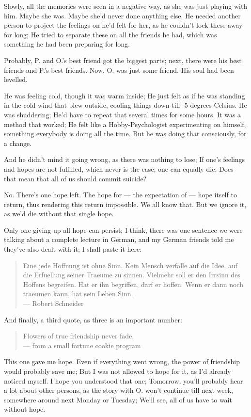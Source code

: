 Slowly, all the memories were seen in a negative way, as she was just playing with him. 
Maybe she was. 
Maybe she'd never done anything else. 
He needed another person to project the feelings on he'd felt for her, as he couldn't lock these away for long; He tried to separate these on all the friends he had, which was something he had been preparing for long.

Probably, P. and O.'s best friend got the biggest parts; next, there were his best friends and P.'s best friends. Now, O. was just some friend. 
His soul had been levelled.

He was feeling cold, though it was warm inside; He just felt as if he was standing in the cold wind that blew outside, cooling things down till -5 degrees Celsius.
He was shuddering; He'd have to repeat that several times for some hours. 
It was a method that worked; He felt like a Hobby-Psychologist experimenting on himself, something everybody is doing all the time. 
But he was doing that consciously, for a change.

And he didn't mind it going wrong, as there was nothing to lose; If one's feelings and hopes are not fulfilled, which never is the case, one can equally die. 
Does that mean that all of us should commit suicide?

No.
There's one hope left. 
The hope for --- the expectation of --- hope itself to return, thus rendering this return impossible. 
We all know that.
But we ignore it, as we'd die without that single hope.

Only one giving up all hope can persist; I think, there was one sentence we were talking about a complete lecture in German, and my German friends told me they've also dealt with it; I shall paste it here: 
\begin{quote}
Eine jede Hoffnung ist ohne Sinn. Kein Mensch verfalle auf die Idee, auf die Erfuellung seiner Traeume zu sinnen. Vielmehr soll er den Irrsinn des Hoffens begreifen. Hat er ihn begriffen, darf er hoffen. Wenn er dann noch traeumen kann, hat sein Leben Sinn.\\
--- Robert Schneider
\end{quote}
And finally, a third quote, as three is an important number: 
\begin{quote}
Flowers of true friendship never fade.\\
--- from a small fortune cookie program
\end{quote}
This one gave me hope. Even if everything went wrong, the power of friendship would probably save me; But I was not allowed to hope for it, as I'd already noticed myself. 
I hope you understood that one; Tomorrow, you'll probably hear a lot about other persons, as the story with O. won't continue till next week, somewhere around next Monday or Tuesday; We'll see, all of us have to wait without hope.


